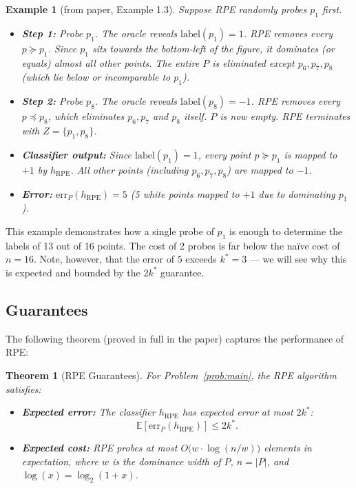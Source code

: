 \documentclass[11pt, a4paper]{article}
\theoremstyle{boxed}
\newtheorem{innertheorem}{Theorem}[section]
\newtheorem{innerexample}{Example}[section]
\newenvironment{theorem}
  {\begin{mdframed}[style=thmstyle]\begin{innertheorem}}
  {\end{innertheorem}\end{mdframed}}
\newenvironment{example}
  {\begin{mdframed}[style=thmstyle]\begin{innerexample}}
  {\end{innerexample}\end{mdframed}}
\begin{document}
\begin{example}[from paper, Example 1.3]
Suppose RPE randomly probes $p_1$ first.
\begin{itemize}
  \item \textbf{Step 1:} Probe $p_1$. The oracle reveals $\text{label}(p_1) = 1$. RPE removes every $p \succeq p_1$. Since $p_1$ sits towards the bottom-left of the figure, it dominates (or equals) almost all other points. The entire $P$ is eliminated except $p_6, p_7, p_8$ (which lie below or incomparable to $p_1$).
  \item \textbf{Step 2:} Probe $p_8$. The oracle reveals $\text{label}(p_8) = -1$. RPE removes every $p \preceq p_8$, which eliminates $p_6, p_7$ and $p_8$ itself. $P$ is now empty. RPE terminates with $Z = \{p_1, p_8\}$.
  \item \textbf{Classifier output:} Since $\text{label}(p_1) = 1$, every point $p \succeq p_1$ is mapped to $+1$ by $h_{\text{RPE}}$. All other points (including $p_6, p_7, p_8$) are mapped to $-1$. 
  \item \textbf{Error:} $\text{err}_P(h_{\text{RPE}}) = 5$ (5 white points mapped to $+1$ due to dominating $p_1$).
\end{itemize}
\end{example}

This example demonstrates how a single probe of $p_1$ is enough to determine the labels of 13 out of 16 points. The cost of 2 probes is far below the naïve cost of $n = 16$. Note, however, that the error of $5$ exceeds $k^* = 3$ --- we will see why this is expected and bounded by the $2k^*$ guarantee.

\subsection{Guarantees}
The following theorem (proved in full in the paper) captures the performance of RPE:
\begin{theorem}[RPE Guarantees]\label{thm:rpe}
For Problem~\ref{prob:main}, the RPE algorithm satisfies:
\begin{itemize}
  \item \textbf{Expected error:} The classifier $h_{\text{RPE}}$ has expected error at most $2k^*$:
  \[
    \mathbb{E}[\text{err}_P(h_{\text{RPE}})] \le 2k^*.
  \]
  \item \textbf{Expected cost:} RPE probes at most $O\bigl(w \cdot \log(n/w)\bigr)$ elements in expectation, where $w$ is the dominance width of $P$, $n = |P|$, and $\log(x) = \log_2(1+x)$.
\end{itemize}
\end{theorem}
\end{document}
